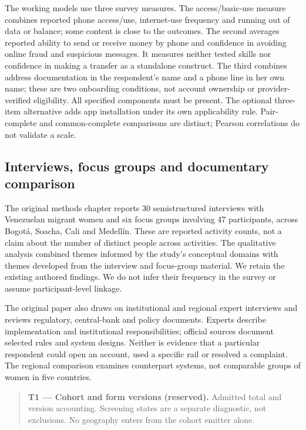 \documentclass[12pt]{article}
\newcommand{\exhibitplaceholder}[3]{%
  \begin{quote}\small
    \textbf{#1 --- #2 (reserved).} #3
  \end{quote}%
}
\begin{document}
The working models use three survey measures. The access/basic-use measure combines reported phone access/use, internet-use frequency and running out of data or balance; some content is close to the outcomes. The second averages reported ability to send or receive money by phone and confidence in avoiding online fraud and suspicious messages. It measures neither tested skills nor confidence in making a transfer as a standalone construct. The third combines address documentation in the respondent's name and a phone line in her own name; these are two onboarding conditions, not account ownership or provider-verified eligibility. All specified components must be present. The optional three-item alternative adds app installation under its own applicability rule. Pair-complete and common-complete comparisons are distinct; Pearson correlations do not validate a scale.

\subsection{Interviews, focus groups and documentary comparison}

The original methods chapter reports 30 semistructured interviews with Venezuelan migrant women and six focus groups involving 47 participants, across Bogotá, Soacha, Cali and Medellín. These are reported activity counts, not a claim about the number of distinct people across activities. The qualitative analysis combined themes informed by the study's conceptual domains with themes developed from the interview and focus-group material. We retain the existing authored findings. We do not infer their frequency in the survey or assume participant-level linkage.

The original paper also draws on institutional and regional expert interviews and reviews regulatory, central-bank and policy documents. Experts describe implementation and institutional responsibilities; official sources document selected rules and system designs. Neither is evidence that a particular respondent could open an account, used a specific rail or resolved a complaint. The regional comparison examines counterpart systems, not comparable groups of women in five countries.

\exhibitplaceholder{T1}{Cohort and form versions}{Admitted total and version accounting. Screening states are a separate diagnostic, not exclusions. No geography enters from the cohort emitter alone.}

\end{document}
